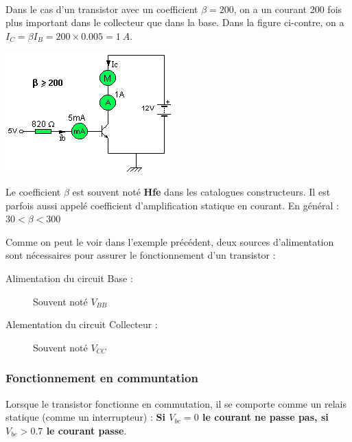 \documentclass[10pt,fleqn]{article} %
\begin{document}
\begin{exemple}~\\
  \begin{minipage}{.6\textwidth}
    Dans le cas d'un transistor avec un coefficient $\beta=\num{200}$, on a un courant \num{200} fois plus important dans le collecteur que dans la base. Dans la figure ci-contre, on a $I_C = \beta I_B = 200 \times \num{0.005} = \SI{1}{A}$.
  \end{minipage}
  \begin{minipage}{.35\textwidth}
    \includegraphics[width=\textwidth]{images/exemple_moteur}
  \end{minipage}
\end{exemple}


\begin{remark}
  Le coefficient $\beta$ est souvent noté \textbf{Hfe} dans les catalogues constructeurs. Il est parfois aussi appelé coefficient d'amplification statique en courant. En général : $30 < \beta < 300$
\end{remark}

  Comme on peut le voir dans l'exemple précédent, deux sources d'alimentation sont nécessaires pour assurer le fonctionnement d'un transistor :
  \begin{description}
    \item[Alimentation du circuit Base : ] Souvent noté $V_{BB}$
    \item[Alementation du circuit Collecteur :] Souvent noté $V_{CC}$
  \end{description}

\subsubsection{Fonctionnement en communtation}
  Lorsque le transistor fonctionne en commutation, il se comporte comme un relais statique (comme un interrupteur) : \textbf{Si $V_{be} = 0$ le courant ne passe pas, si $V_{be}>0.7$ le courant passe}.
\end{document}
